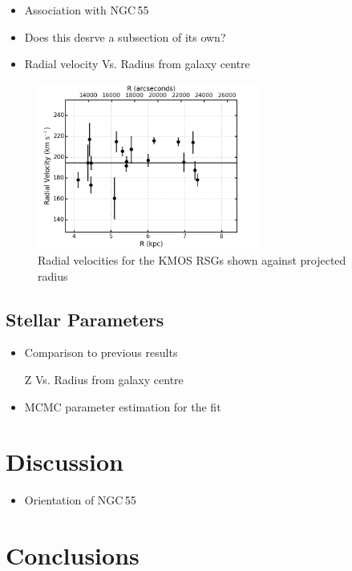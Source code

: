 \begin{itemize}
    \item Association with NGC\,55
    \item Does this desrve a subsection of its own?
    \item Radial velocity Vs. Radius from galaxy centre
\end{itemize}

\begin{figure}
 \centering
 \includegraphics[width=0.65\textwidth]{ngc55/ngc55-RvsRV-F1}
 \caption[Radial velocities for the KMOS RSGs shown against projected radius]{
 Radial velocities for the KMOS RSGs shown against projected radius
         }

 \label{fig:ngc55}
\end{figure}
\subsection{Stellar Parameters} %
\label{sub:stellar_parameters}
\begin{itemize}
    \item Comparison to previous results
    \item [Z] Vs. Radius from galaxy centre
    \item MCMC parameter estimation for the fit
    \end{itemize}



\section{Discussion} %
\label{sec:discussion}

\begin{itemize}
    \item Orientation of NGC\,55
\end{itemize}

\section{Conclusions} %
\label{sec:conclusions}


